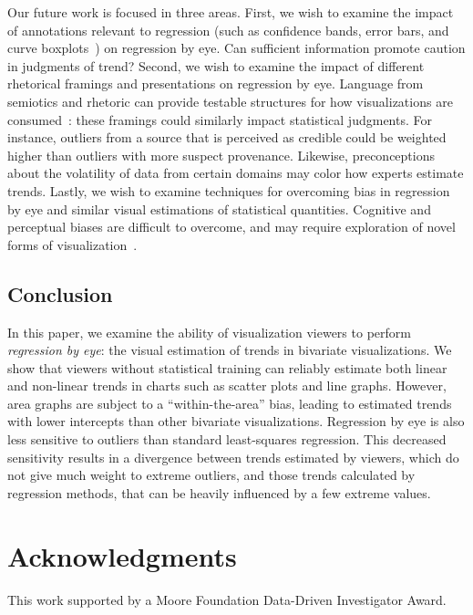 \documentclass{sigchi}
\begin{document}
Our future work is focused in three areas. First, we wish to examine the impact of annotations relevant to regression (such as confidence bands, error bars, and curve boxplots~\cite{mirzargar2014curve}) on regression by eye. Can sufficient information promote caution in judgments of trend? Second, we wish to examine the impact of different rhetorical framings and presentations on regression by eye. Language from semiotics and rhetoric can provide testable structures for how visualizations are consumed~\cite{hullman2011visualization}: these framings could similarly impact statistical judgments. For instance, outliers from a source that is perceived as credible could be weighted higher than outliers with more suspect provenance. Likewise, preconceptions about the volatility of data from certain domains may color how experts estimate trends. Lastly, we wish to examine techniques for overcoming bias in regression by eye and similar visual estimations of statistical quantities. Cognitive and perceptual biases are difficult to overcome, and may require exploration of novel forms of visualization~\cite{micallef2012assessing}.

\subsection{Conclusion}

In this paper, we examine the ability of visualization viewers to perform \emph{regression by eye}: the visual estimation of trends in bivariate visualizations. We show that viewers without statistical training can reliably estimate both linear and non-linear trends in charts such as scatter plots and line graphs. However, area graphs are subject to a ``within-the-area'' bias, leading to estimated trends with lower intercepts than other bivariate visualizations. Regression by eye is also less sensitive to outliers than standard least-squares regression. This decreased sensitivity results in a divergence between trends estimated by viewers, which do not give much weight to extreme outliers, and those trends calculated by regression methods, that can be heavily influenced by a few extreme values. 


\section{Acknowledgments}

This work supported by a Moore Foundation Data-Driven Investigator Award. 
\end{document}

